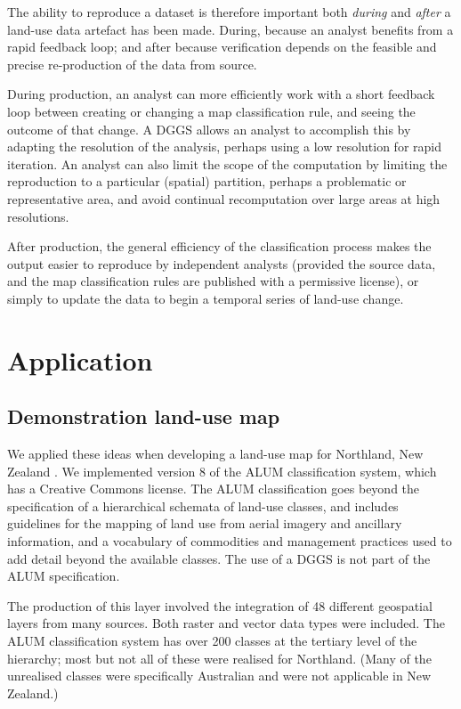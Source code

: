 \documentclass[]{interact}
\theoremstyle{plain}%
\theoremstyle{definition}
\theoremstyle{remark}
\begin{document}
The ability to reproduce a dataset is therefore important both \textit{during} and \textit{after} a land-use data artefact has been made. During, because an analyst benefits from a rapid feedback loop; and after because verification depends on the feasible and precise re-production of the data from source.

During production, an analyst can more efficiently work with a short feedback loop between creating or changing a map classification rule, and seeing the outcome of that change. A \ac{DGGS} allows an analyst to accomplish this by adapting the resolution of the analysis, perhaps using a low resolution for rapid iteration. An analyst can also limit the scope of the computation by limiting the reproduction to a particular (spatial) partition, perhaps a problematic or representative area, and avoid continual recomputation over large areas at high resolutions.

After production, the general efficiency of the classification process makes the output easier to reproduce by independent analysts (provided the source data, and the map classification rules are published with a permissive license), or simply to update the data to begin a temporal series of land-use change.

\section{Application} %

\subsection{Demonstration land-use map}

We applied these ideas when developing a land-use map for Northland, New Zealand \citep[see][]{law2023}. We implemented version 8 of the \ac{ALUM} classification system, which has a Creative Commons license. The \ac{ALUM} classification goes beyond the specification of a hierarchical schemata of land-use classes, and includes guidelines for the mapping of land use from aerial imagery and ancillary information, and a vocabulary of commodities and management practices used to add detail beyond the available classes. The use of a \ac{DGGS} is not part of the \ac{ALUM} specification.

The production of this layer involved the integration of 48 different geospatial layers from many sources. Both raster and vector data types were included. The \ac{ALUM} classification system has over 200 classes at the tertiary level of the hierarchy; most but not all of these were realised for Northland. (Many of the unrealised classes were specifically Australian and were not applicable in New Zealand.)
\end{document}

